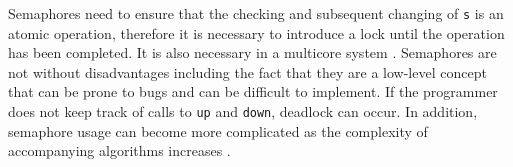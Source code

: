 \documentclass[12pt,a4paper,oneside]{article}
\def\code#1{\texttt{#1}}
\begin{document}
\begin{spacing}{1.4}
Semaphores need to ensure that the checking and subsequent changing of \code{s} is an atomic operation, therefore it is necessary to introduce a lock until the operation has been completed. It is also necessary in a multicore system \citep{modernOS}. Semaphores are not without disadvantages including the fact that they are a low-level concept that can be prone to bugs and can be difficult to implement. If the programmer does not keep track of calls to \code{up} and \code{down}, deadlock can occur. In addition, semaphore usage can become more complicated as the complexity of accompanying algorithms increases \citep{semDisadvantages}.

\end{spacing}	   			

\end{document}
